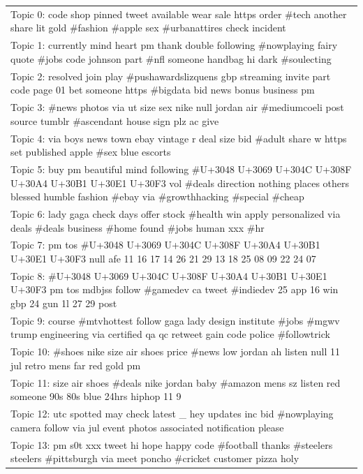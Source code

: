 \documentclass[11pt]{article}
\begin{document}
\begin{appendices}
\begin{table}
    \centering
    \begin{tabular}{|p{\linewidth}|}
    \hline
    Topic 0: code shop pinned tweet available wear sale https order \#tech another share lit gold \#fashion \#apple sex \#urbanattires check incident\\
    Topic 1: currently mind heart pm thank double following \#nowplaying fairy quote \#jobs code johnson part \#nfl someone handbag hi dark \#soulecting\\
    Topic 2: resolved join play \#pushawardslizquens gbp streaming invite part code page 01 bet someone https \#bigdata bid news bonus business pm\\
    Topic 3: \#news photos via ut size sex nike null jordan air \#mediumcoeli post source tumblr \#ascendant house sign plz ac give\\
    Topic 4: via boys news town ebay vintage r deal size bid \#adult share w https set published apple \#sex blue escorts\\
    Topic 5: buy pm beautiful mind following \#U+3048 U+3069 U+304C U+308F U+30A4 U+30B1 U+30E1 U+30F3 vol \#deals direction nothing places others blessed humble fashion \#ebay via \#growthhacking \#special \#cheap\\
    Topic 6: lady gaga check days offer stock \#health win apply personalized via deals \#deals business \#home found \#jobs human xxx \#hr\\
    Topic 7: pm tos \#U+3048 U+3069 U+304C U+308F U+30A4 U+30B1 U+30E1 U+30F3 null afe 11 16 17 14 26 21 29 13 18 25 08 09 22 24 07\\
    Topic 8: \#U+3048 U+3069 U+304C U+308F U+30A4 U+30B1 U+30E1 U+30F3 pm tos mdbjss follow \#gamedev ca tweet \#indiedev 25 app 16 win gbp 24 gun 1l 27 29 post\\
    Topic 9: course \#mtvhottest follow gaga lady design institute \#jobs \#mgwv trump engineering via certified qa qc retweet gain code police \#followtrick\\
    Topic 10: \#shoes nike size air shoes price \#news low jordan ah listen null 11 jul retro mens far red gold pm\\
    Topic 11: size air shoes \#deals nike jordan baby \#amazon mens sz listen red someone 90s 80s blue 24hrs hiphop 11 9\\
    Topic 12: utc spotted may check latest \_ hey updates inc bid \#nowplaying camera follow via jul event photos associated notification please\\
    Topic 13: pm s0t xxx tweet hi hope happy code \#football thanks \#steelers steelers \#pittsburgh via meet poncho \#cricket customer pizza holy\\

\end{tabular}
\end{table}
\end{appendices}
\end{document}
